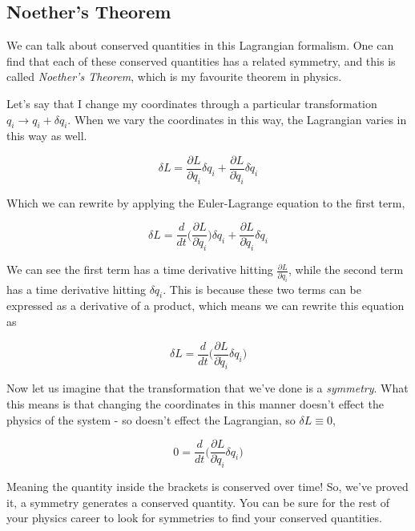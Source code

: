 \documentclass{article}
\begin{document}
\subsection{Noether's Theorem}
We can talk about conserved quantities in this Lagrangian formalism. One can find that each of these conserved quantities has a related symmetry, and this is called \textit{Noether's Theorem}, which is my favourite theorem in physics. 

Let's say that I change my coordinates through a particular transformation $q_i \rightarrow q_i + \delta q_i$. When we vary the coordinates in this way, the Lagrangian varies in this way as well.

\begin{equation}
    \delta L =\frac{\partial L}{\partial q_i}\delta q_i + \frac{\partial L}{\partial \dot{q}_i}\delta \dot{q}_i
\end{equation}

Which we can rewrite by applying the Euler-Lagrange equation to the first term,

\begin{equation}
   \delta L = \frac{d}{dt}\biggl(\frac{\partial L}{\partial \dot{q}_i}\biggr)\delta q_i + \frac{\partial L}{\partial \dot{q}_i}\delta \dot{q}_i
\end{equation}

We can see the first term has a time derivative hitting $\frac{\partial L}{\partial \dot{q}_i}$, while the second term has a time derivative hitting $\delta q_i$. This is because these two terms can be expressed as a derivative of a product, which means we can rewrite this equation as

\begin{equation}
    \delta L = \frac{d}{dt}\biggl(\frac{\partial L}{\partial \dot{q}_i}\delta q_i\bigg)
\end{equation}

Now let us imagine that the transformation that we've done is a \textit{symmetry}. What this means is that changing the coordinates in this manner doesn't effect the physics of the system - so doesn't effect the Lagrangian, so $\delta L \equiv 0$,

\begin{equation}
    0 =\frac{d}{dt}\biggl(\frac{\partial L}{\partial \dot{q}_i}\delta q_i\bigg)
\end{equation}

Meaning the quantity inside the brackets is conserved over time! So, we've proved it, a symmetry generates a conserved quantity. You can be sure for the rest of your physics career to look for symmetries to find your conserved quantities.
\end{document}
